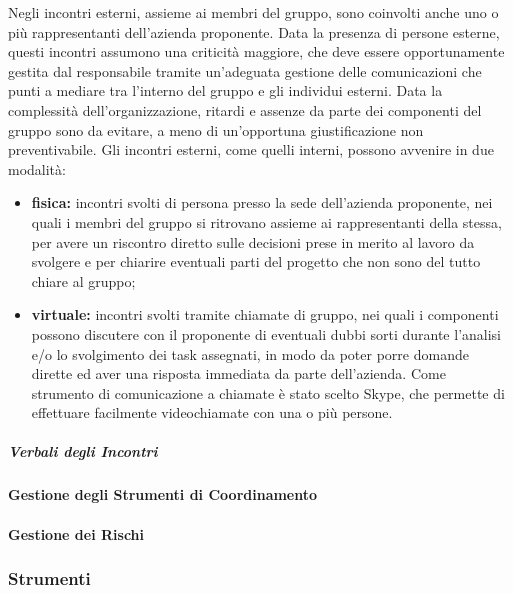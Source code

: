				Negli incontri esterni, assieme ai membri del gruppo, sono coinvolti anche uno o più rappresentanti dell'azienda proponente.
				\newline
				Data la presenza di persone esterne, questi incontri assumono una criticità maggiore, che deve essere opportunamente gestita dal responsabile tramite un'adeguata gestione delle comunicazioni che punti a mediare tra l'interno del gruppo e gli individui esterni.
				\newline
				Data la complessità dell'organizzazione, ritardi e assenze da parte dei componenti del gruppo sono da evitare, a meno di un'opportuna giustificazione non preventivabile.
				\newline
				Gli incontri esterni, come quelli interni, possono avvenire in due modalità:
				\begin{itemize}
					\item \textbf{fisica:} incontri svolti di persona presso la sede dell'azienda proponente, nei quali i membri del gruppo si ritrovano assieme ai rappresentanti della stessa, per avere un riscontro diretto sulle decisioni prese in merito al lavoro da svolgere e per chiarire eventuali parti del progetto che non sono del tutto chiare al gruppo;
					\item \textbf{virtuale:} incontri svolti tramite chiamate di gruppo, nei quali i componenti possono discutere con il proponente di eventuali dubbi sorti durante l'analisi e/o lo svolgimento dei task assegnati, in modo da poter porre domande dirette ed aver una risposta immediata da parte dell'azienda.
					\newline
					Come strumento di comunicazione a chiamate è stato scelto Skype, che permette di effettuare facilmente videochiamate con una o più persone.
				\end{itemize}
			
			\subparagraph{Verbali degli Incontri}
		
		\paragraph{Gestione degli Strumenti di Coordinamento}
		
		\paragraph{Gestione dei Rischi}
	
	\subsubsection{Strumenti}